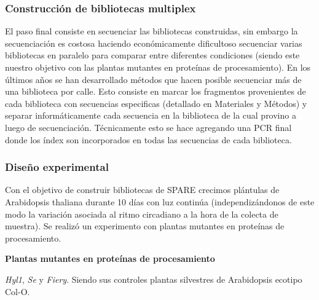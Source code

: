 \subsubsection{Construcción de bibliotecas multiplex}
El paso final consiste en secuenciar las bibliotecas construidas, sin embargo la secuenciación es costosa haciendo económicamente dificultoso secuenciar varias bibliotecas en paralelo para comparar entre diferentes condiciones (siendo este nuestro objetivo con las plantas mutantes en proteínas de procesamiento).
En los últimos años se han desarrollado métodos que hacen posible secuenciar más de una biblioteca por calle.
Esto consiste en marcar los fragmentos provenientes de cada biblioteca con secuencias especificas (detallado en Materiales y Métodos) y separar informáticamente cada secuencia en la biblioteca de la cual provino a luego de secuenciación.
Técnicamente esto se hace agregando una PCR final donde los índex son incorporados en todas las secuencias de cada biblioteca.

\subsubsection{Diseño experimental}

Con el objetivo de construir bibliotecas de SPARE crecimos plántulas de Arabidopsis thaliana durante 10 días con luz continúa (independizándonos de este modo la variación asociada al ritmo circadiano a la hora de la colecta de muestra).
Se realizó un experimento con plantas mutantes en proteínas de procesamiento.

\textbf{Plantas mutantes en proteínas de procesamiento}

\textit{Hyl1}, \textit{Se} y \textit{Fiery}.
Siendo sus controles plantas silvestres de Arabidopsis ecotipo Col-O.





